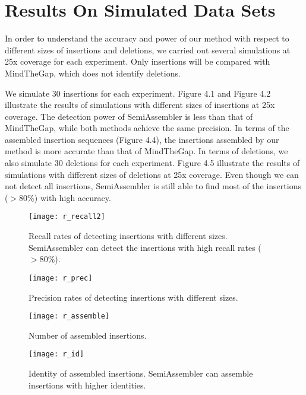 \section{Results On Simulated Data Sets}


In order to understand the accuracy and power of our method  with respect to different sizes of insertions and deletions, we carried out several simulations at 25x coverage for each experiment. Only insertions will be compared with MindTheGap, which does not identify deletions.  

We simulate 30 insertions for each experiment. Figure 4.1 and Figure 4.2 illustrate the results of simulations with different sizes of insertions at 25x coverage. The detection power of SemiAssembler is less than that of MindTheGap, while both methods achieve the same precision. In terms of the assembled insertion sequences (Figure 4.4), the insertions assembled by our method is more accurate than that of MindTheGap. 
In terms of deletions, we also simulate 30 deletions for each experiment. Figure 4.5 illustrate the results of simulations with different sizes of deletions at 25x coverage. Even though we can not detect all insertions, SemiAssembler is still able to find most of the insertions ($>80$\%) with high accuracy.



\begin{figure}[ht]
\begin{center}
\texttt{[image: r\_recall2]}
\caption{Recall rates of detecting insertions with different sizes. SemiAssembler can detect the insertions with high recall rates ($>80$\%).}
\label{}
\end{center}
\end{figure}

\begin{figure}[ht]
\begin{center}
\texttt{[image: r\_prec]}
\caption{Precision rates of detecting insertions with different sizes.}
\label{}
\end{center}
\end{figure}

\begin{figure}[ht]
\begin{center}
\texttt{[image: r\_assemble]}
\caption{Number of assembled insertions.}
\label{}
\end{center}
\end{figure}

\begin{figure}[ht]
\begin{center}
\texttt{[image: r\_id]}
\caption{Identity of assembled insertions. SemiAssembler can assemble insertions with higher identities.}
\label{}
\end{center}
\end{figure}

